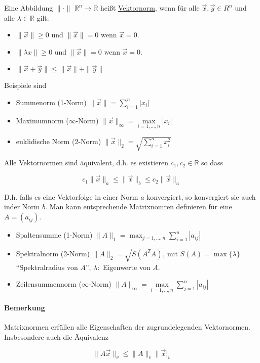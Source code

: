 \documentclass[a4paper,ngerman]{scrbook}
\newcommand{\R}{\ensuremath{\mathds{R}}}%
\begin{document}
Eine Abbildung  $\| \cdot \|$ $\R^n \to \R$ heißt \underline{Vektornorm}, wenn für alle $\vec{x}, \vec{y} \in R^n$ und alle $\lambda \in \R$ gilt:
\begin{itemize}
\item $\|\vec{x}\| \geq 0$ und $\|\vec{x}\| = 0$ wenn $\vec{x} = 0$.
\item $\|\lambda x\| \geq 0$ und $\|\vec{x}\| = 0$ wenn $\vec{x} = 0$.
\item $\|\vec{x} + \vec{y}\| \leq \|\vec{x}\| + \|\vec{y}\|$
\end{itemize}

Beispiele sind

\begin{itemize}
\item Summenorm (1-Norm) $\|\vec{x}\| = \sum_{i=1}^n |x_i|$
  \item Maximumnorm ($\infty$-Norm) $\|\vec{x}\|_{\infty} = \max\limits_{i=1,\dots,n} |x_i|$
\item euklidische Norm (2-Norm) $\|\vec{x}\|_2 = \sqrt{\sum_{i=1}^n x_i^2}$
\end{itemize}

Alle Vektornormen sind äquivalent, d.h\@. es existieren $c_1,c_2 \in \R$ so dass

\[
c_1\|\vec{x}\|_a \leq \|\vec{x}\|_b \leq c_2 \|\vec{x}\|_a
\]

D.h\@. falls es eine Vektorfolge in einer Norm $a$ konvergiert, so konvergiert sie auch inder Norm $b$. Man kann entsprechende Matrixnomren definieren für eine $A = (a_{ij})$.
\begin{itemize}
\item Spaltensumme (1-Norm) $\|A\|_1 = \max_{j=1,\dots,n} \sum_{i=1}^n |a_{ij}|$
\item Spektralnorm (2-Norm) $\|A\|_2 = \sqrt{S(A^TA)}$, mit $S(A) = \max\{\lambda\}$ "`Spektralradius von $A$"', $\lambda\colon$ Eigenwerte von $A$.
\item Zeilensummennorm ($\infty$-Norm) $\|A\|_\infty = \max\limits_{i=1,\dots,n} \displaystyle\sum_{j=1}^n |a_{ij}|$
\end{itemize}

\paragraph{Bemerkung}

Matrixnormen erfüllen alle Eigenschaften der zugrundelegenden Vektornormen. Insbesondere auch die Äquivalenz

\[
\|A\vec{x}\|_v \leq \|A\|_v\|\vec{x}|_v
\]
\end{document}
